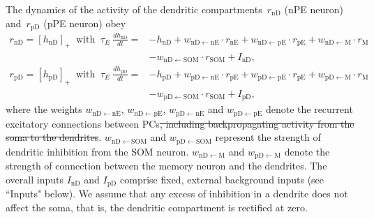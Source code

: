 \documentclass[10pt,a4paper]{article}
\providecommand{\DIFdeltex}[1]{{\protect\color{red}\sout{#1}}}                      %
\providecommand{\DIFdelbegin}{} %
\providecommand{\DIFdelend}{} %
\providecommand{\DIFdel}[1]{\texorpdfstring{\DIFdeltex{#1}}{}} %
\newcommand{\DIFscaledelfig}{0.5}
\newlength{\DIFdelgraphicswidth} %
\newlength{\DIFdelgraphicsheight} %
\newcommand{\DIFdelincludegraphics}[2][]{%
\sbox{\DIFdelgraphicsbox}{\DIFOincludegraphics[#1]{#2}}%
\settoboxwidth{\DIFdelgraphicswidth}{\DIFdelgraphicsbox} %
\settoboxtotalheight{\DIFdelgraphicsheight}{\DIFdelgraphicsbox} %
\scalebox{\DIFscaledelfig}{%
\parbox[b]{\DIFdelgraphicswidth}{\usebox{\DIFdelgraphicsbox}\\[-\baselineskip] \rule{\DIFdelgraphicswidth}{0em}}\llap{\resizebox{\DIFdelgraphicswidth}{\DIFdelgraphicsheight}{%
\setlength{\unitlength}{\DIFdelgraphicswidth}%
\begin{picture}(1,1)%
\thicklines\linethickness{2pt} %
{\color[rgb]{1,0,0}\put(0,0){\framebox(1,1){}}}%
{\color[rgb]{1,0,0}\put(0,0){\line( 1,1){1}}}%
{\color[rgb]{1,0,0}\put(0,1){\line(1,-1){1}}}%
\end{picture}%
}\hspace*{3pt}}} %
} %
\DeclareRobustCommand{\DIFdelbegin}{\DIFOdelbegin \let\includegraphics\DIFdelincludegraphics} %
\DeclareRobustCommand{\DIFdelend}{\DIFOaddend \let\includegraphics\DIFOincludegraphics} %
\begin{document}
The dynamics of the activity of the dendritic compartments~$r_\mathrm{nD}$ (nPE neuron) and~$r_\mathrm{pD}$ (pPE neuron) obey \citep{wilson1972excitatory}
%
\begin{align}
r_\mathrm{nD} = [h_\mathrm{nD}]_+ \ \mbox{ with }\ \tau_E\ \frac{dh_\mathrm{nD}}{dt} =& - h_\mathrm{nD} +  w_\mathrm{nD\leftarrow nE}\cdot r_\mathrm{nE} +  w_\mathrm{nD\leftarrow pE}\cdot r_\mathrm{pE} + w_\mathrm{nD\leftarrow M}\cdot  r_\mathrm{M} \nonumber\\
& - w_\mathrm{nD\leftarrow SOM}\cdot r_\mathrm{SOM} + I_\mathrm{nD}, \nonumber\\
r_\mathrm{pD} = [h_\mathrm{pD}]_+ \ \mbox{ with }\ \tau_E\ \frac{dh_\mathrm{pD}}{dt} =& - h_\mathrm{pD} +  w_\mathrm{pD\leftarrow nE}\cdot r_\mathrm{pE} +  w_\mathrm{pD\leftarrow pE}\cdot r_\mathrm{pE}+ w_\mathrm{pD\leftarrow M}\cdot  r_\mathrm{M}  \nonumber\\
&- w_\mathrm{pD\leftarrow SOM}\cdot r_\mathrm{SOM} + I_\mathrm{pD},
\end{align}
%
where the weights $w_{\mathrm{nD\leftarrow nE}}$, $w_{\mathrm{nD\leftarrow pE}}$, $w_{\mathrm{pD\leftarrow nE}}$ and $w_{\mathrm{pD\leftarrow pE}}$ denote the recurrent excitatory connections between PCs\DIFdelbegin \DIFdel{, including backpropagating activity from the soma to the dendrites}\DIFdelend . $w_{\mathrm{nD\leftarrow SOM}}$ and $w_{\mathrm{pD\leftarrow SOM}}$ represent the strength of dendritic inhibition from the SOM neuron. $w_{\mathrm{nD\leftarrow M}}$ and $w_{\mathrm{pD\leftarrow M}}$ denote the strength of connection between the memory neuron and the dendrites. The overall inputs $I_\mathrm{nD}$ and $I_\mathrm{pD}$ comprise fixed, external background inputs (see ``Inputs" below). We assume that any excess of inhibition in a dendrite does not affect the soma, that is, the dendritic compartment is rectified at zero. 
\end{document}
